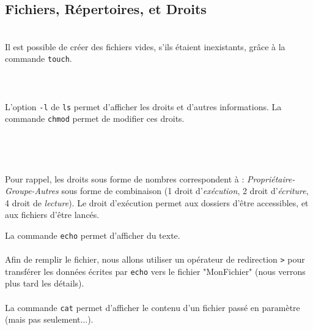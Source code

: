 \subsection{Fichiers, Répertoires, et Droits}

\bigskip

\\

Il est possible de créer des fichiers vides, s'ils étaient inexistants, grâce à la commande \texttt{touch}.\\

\\
\\
\\

L'option \texttt{-l} de \texttt{ls} permet d'afficher les droits et d'autres informations.
La commande \texttt{chmod} permet de modifier ces droits.\\

\\
\\
\\
\\

Pour rappel, les droits sous forme de nombres correspondent à : \textit{Propriétaire-Groupe-Autres} sous forme de combinaison (1 droit d'\textit{exécution}, 2 droit d'\textit{écriture}, 4 droit de \textit{lecture}).
Le droit d'exécution permet aux dossiers d'être accessibles, et aux fichiers d'être lancés.\\

\bigskip

La commande \texttt{echo} permet d'afficher du texte.\\

\\

Afin de remplir le fichier, nous allons utiliser un opérateur de redirection \texttt{>} pour transférer les données écrites par \texttt{echo} vers le fichier "MonFichier" (nous verrons plus tard les détails).\\

\\

La commande \texttt{cat} permet d'afficher le contenu d'un fichier passé en paramètre (mais pas seulement...).\\

